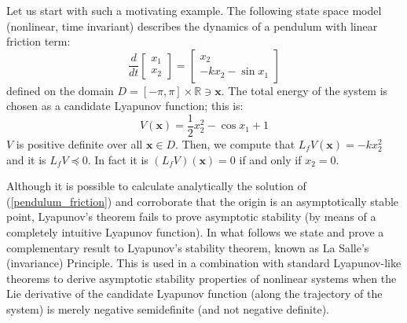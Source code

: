 \documentclass[a4paper,10pt,oneside]{book}
\begin{document}
Let us start with such a motivating example. The following state space model
(nonlinear, time invariant) describes the dynamics of a pendulum with linear friction term:
\begin{equation}\label{pendulum_friction}
 \frac{d}{dt}
\left[ {\begin{array}{c}
x_1  \\
 x_2 
 \end{array} } \right]=
\left[ {\begin{array}{cc}
 x_2  \\
 -kx_2-\sin x_1
 \end{array} } \right]
\end{equation}
defined on the domain $D=[-\pi,\pi]\times\mathbb{R}\ni \mathbf{x}$.
The total energy of the system is chosen as a candidate Lyapunov function; this is:
\begin{equation}
 V(\mathbf{x})=\frac{1}{2}x_2^2-\cos x_1+1
\end{equation}
$V$ is positive definite over all $\mathbf{x}\in D$. Then, we compute that $L_f V (\mathbf{x})=-kx_2^2$
and it is $L_f V \preceq 0$. In fact it is $(L_f V)(\mathbf{x})=0$ if and only if $x_2=0$.

Although it is possible to
calculate analytically the solution of (\ref{pendulum_friction}) and corroborate that the
origin is an asymptotically stable point, Lyapunov's theorem fails to prove asymptotic 
stability (by means of a completely intuitive Lyapunov function). In what follows we 
state and prove a complementary result to Lyapunov's stability theorem, known as La Salle’s 
(invariance) Principle. This is used in a combination with standard Lyapunov-like theorems to 
derive asymptotic stability properties of nonlinear systems when
the Lie derivative of the candidate Lyapunov function (along the trajectory of the system) is merely negative
semidefinite (and not negative definite).
\end{document}
